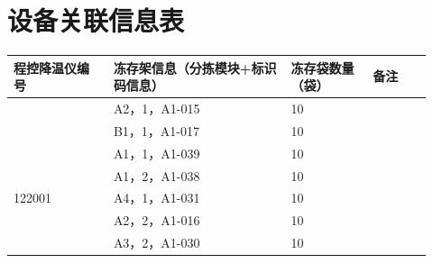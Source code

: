 \documentclass[UTF8,10pt,a4paper,fontset=fandol]{ctexart}
\newcommand{\fieldvalue}[1]{#1}
\newcommand{\handwritten}[1]{#1}
\begin{document}
\section{设备关联信息表}

\begin{center}
\small
\begin{tabular}{|p{0.22\linewidth}|p{0.39\linewidth}|p{0.18\linewidth}|p{0.13\linewidth}|}
\hline
程控降温仪编号 & 冻存架信息（分拣模块+标识码信息） & 冻存袋数量（袋） & 备注\\
\hline
&
\fieldvalue{\handwritten{A2，1，A1-015}} &
\fieldvalue{\handwritten{10}} &\\
\hline
&
\fieldvalue{\handwritten{B1，1，A1-017}} &
\fieldvalue{\handwritten{10}} &\\
\hline
&
\fieldvalue{\handwritten{A1，1，A1-039}} &
\fieldvalue{\handwritten{10}} &\\
\hline
&
\fieldvalue{\handwritten{A1，2，A1-038}} &
\fieldvalue{\handwritten{10}} &\\
\hline
\fieldvalue{\handwritten{122001}} &
\fieldvalue{\handwritten{A4，1，A1-031}} &
\fieldvalue{\handwritten{10}} &\\
\hline
&
\fieldvalue{\handwritten{A2，2，A1-016}} &
\fieldvalue{\handwritten{10}} &\\
\hline
&
\fieldvalue{\handwritten{A3，2，A1-030}} &
\fieldvalue{\handwritten{10}} &\\

\end{tabular}
\end{center}
\end{document}
